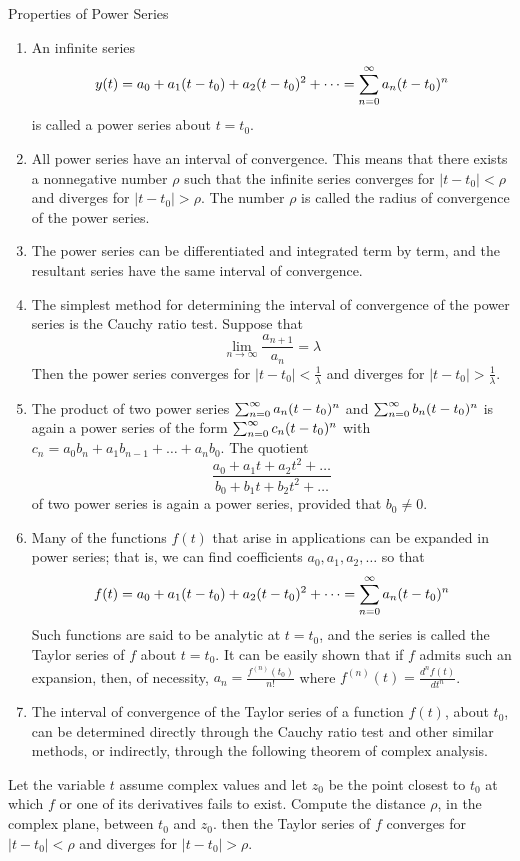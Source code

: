 \documentclass[12pt]{article}
\begin{document}
Properties of Power Series \begin{enumerate} 
\item An infinite series $$y(t) = a_0 + a_1(t - t_0) + a_2(t - t_0)^2 + \dots = \sum_{n = 0}^{\infty} a_n(t - t_0)^n $$ is called a power series about $t = t_0$. 
\item All power series have an interval of convergence. This means that there exists a nonnegative number $\rho$ such that the infinite series converges for $|t - t_0| < \rho$ and diverges for $|t - t_0| > \rho$. The number $\rho$ is called the radius of convergence of the power series. 
\item The power series can be differentiated and integrated term by term, and the resultant series have the same interval of convergence.
\item The simplest method for determining the interval of convergence of the power series is the Cauchy ratio test. Suppose that $$\lim_{n \to \infty} \frac{a_{n + 1}}{a_n} = \lambda$$ Then the power series converges for $|t - t_0| < \frac{1}{\lambda}$ and diverges for $|t - t_0| > \frac{1}{\lambda}$. 
\item The product of two power series $\sum_{n = 0}^{\infty} a_n (t - t_0)^n$ and $\sum_{n = 0}^{\infty} b_n(t - t_0)^n$ is again a power series of the form $\sum_{n = 0}^{\infty} c_n(t - t_0)^n$ with $c_n = a_0b_n + a_1b_{n - 1} + \dots + a_nb_0$. The quotient $$\frac{a_0 + a_1t + a_2t^2 + \dots}{b_0 + b_1t + b_2t^2 + \dots} $$ of two power series is again a power series, provided that $b_0 \neq 0$. 
\item Many of the functions $f(t)$ that arise in applications can be expanded in power series; that is, we can find coefficients $a_0, a_1, a_2, \dots$ so that $$f(t) = a_0 + a_1(t - t_0) + a_2(t - t_0)^2 + \dots = \sum_{n = 0}^{\infty} a_n(t - t_0)^n$$ 
Such functions are said to be analytic at $t = t_0$, and the series is called the Taylor series of $f$ about $t = t_0$. It can be easily shown that if $f$ admits such an expansion, then, of necessity, $a_n = \frac{f^{(n)}(t_0)}{n!}$ where $f^{(n)}(t) = \frac{d^nf(t)}{dt^n}$. 
\item The interval of convergence of the Taylor series of a function $f(t)$, about $t_0$, can be determined directly through the Cauchy ratio test and other similar methods, or indirectly, through the following theorem of complex analysis. \end{enumerate} 

\begin{theorem} Let the variable $t$ assume complex values and let $z_0$ be the point closest to $t_0$ at which $f$ or one of its derivatives fails to exist. Compute the distance $\rho$, in the complex plane, between $t_0$ and $z_0$. then the Taylor series of $f$ converges for $|t - t_0| < \rho$ and diverges for $|t - t_0| > \rho$. \end{theorem} 
\end{document}
